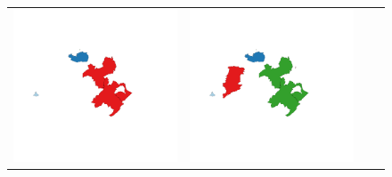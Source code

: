 \begin{figure}[p]
\begin{tabularx}{1\textwidth}{XXXX}
\includegraphics[width=1\linewidth]{images/ch6/contig/03}&
\includegraphics[width=1\linewidth]{images/ch6/contig/04} \\

\end{tabularx}
\end{figure}
